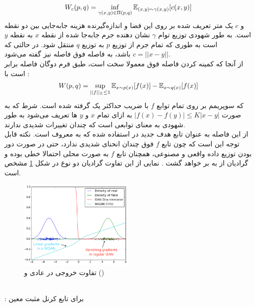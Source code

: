\begin{align}
	W_c(p,q) = \inf_{\gamma(x,y) \in \Pi(p,q)} \mathbb E_{(x,y) \sim \gamma(x,y)} [ c(x,y) ]
\end{align}
و $c$ یک متر تعریف شده بر روی این فضا و اندازه‌گیرنده هزینه جابه‌جایی بین دو نقطه است. به طور شهودی توزیع توام $\gamma$ نشان دهنده جرم جابه‌جا شده از نقطه $x$ به نقطه $y$ است به طوری که تمام جرم از توزیع $p$ به توزیع $q$ منتقل شود. در حالتی که $c = ||x-y||$ باشد، به فاصله فوق فاصله \earthmover{} نیز گفته می‌شود.
\\
از آنجا که کمینه کردن فاصله فوق معمولا سخت است، طبق فرم دوگان  فاصله \earthmover{} برابر است با \cite{wgan}:
\begin{align}
	W(p, q) = \sup_{||f||_L \leq 1} \mathbb E_{x \sim p(x)}[f(x)] - \mathbb E_{x \sim q(x)}[f(x)]
\end{align}
که سوپریمم بر روی تمام توابع $f$ با ضریب \lipschitz{} حداکثر یک گرفته شده است. شرط \lipschitz[K-]{} که به صورت
$|f(x) - f(y)| \leq K |x - y|$
به ازای تمام $x$ و $y$ ها تعریف می‌شود به طور شهودی به معنای توابعی است که چندان تغییرات شدیدی ندارند.
\\
از این فاصله به عنوان تابع هدف جدید در \gan{} استفاده شده که به \wgan{} معروف است. نکته قابل توجه این است که چون تابع $f$ فوق چندان انحنای شدیدی ندارد، حتی در صورت دور بودن توزیع داده واقعی و مصنوعی، همچنان تابع $f$ به صورت محلی احتمالا خطی بوده و گرادیان از \discriminator{} به \generator{} بر خواهد گشت \cite{wgan}. نمایی از این تفاوت گرادیان دو نوع  \gan{} در شکل \ref{fig:chap2:wgan1} مشخص است.
\begin{figure}[h]
	\centering
	\includegraphics[width=0.5\textwidth]{images/wgan1.png}
	\caption{
        تفاوت خروجی \discriminator{} در \gan{} عادی و \wgan{} ()
        \cite{wgan}
    }
	\label{fig:chap2:wgan1}
\end{figure}
\\
:
برای تابع کرنل مثبت معین 
